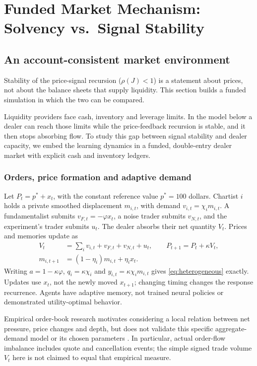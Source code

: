 \documentclass[10pt,twocolumn,letterpaper]{article}
\theoremstyle{definition}
\theoremstyle{remark}
\begin{document}
\section{Funded Market Mechanism: Solvency vs.\ Signal Stability}
\label{sec:ch6}

\subsection{An account-consistent market environment}
\label{sec:account}
\label{sec:economic_measurement}
Stability of the price-signal recursion ($\rho(J)<1$) is a statement about prices, not about the balance sheets that supply liquidity. This section builds a funded simulation in which the two can be compared.

Liquidity providers face cash, inventory and leverage limits. In the model below a dealer can reach those limits while the price-feedback recursion is stable, and it then stops absorbing flow. To study this gap between signal stability and dealer capacity, we embed the learning dynamics in a funded, double-entry dealer market with explicit cash and inventory ledgers.

\subsubsection{Orders, price formation and adaptive demand}
Let $P_t=p^*+x_t$, with the constant reference value $p^*=100$ dollars. Chartist $i$ holds a private smoothed displacement $m_{i,t}$, with demand $v_{i,t}=\chi_i m_{i,t}$. A fundamentalist submits $v_{F,t}=-\varphi x_t$, a noise trader submits $v_{N,t}$, and the experiment's trader submits $u_t$. The dealer absorbs their net quantity $V_t$. Prices and memories update as
\begin{align}
 V_t&=\sum_i v_{i,t}+v_{F,t}+v_{N,t}+u_t,\qquad
 P_{t+1}=P_t+\kappa V_t,\\
 m_{i,t+1}&=(1-\eta_i)m_{i,t}+\eta_i x_t.
 \label{eq:economic_orders}
\end{align}
Writing $a=1-\kappa\varphi$, $q_i=\kappa\chi_i$ and $y_{i,t}=\kappa\chi_i m_{i,t}$ gives \eqref{eq:heterogeneous} exactly. Updates use $x_t$, not the newly moved $x_{t+1}$; changing timing changes the response recurrence. Agents have adaptive memory, not trained neural policies or demonstrated utility-optimal behavior.

Empirical order-book research motivates considering a local relation between net pressure, price changes and depth, but does not validate this specific aggregate-demand model or its chosen parameters \citep{cont2014}. In particular, actual order-flow imbalance includes quote and cancellation events; the simple signed trade volume $V_t$ here is not claimed to equal that empirical measure.
\end{document}
